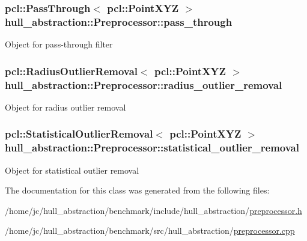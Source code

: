 \subsubsection[{\texorpdfstring{pass\+\_\+through}{pass_through}}]{\setlength{\rightskip}{0pt plus 5cm}pcl\+::\+Pass\+Through$<$ pcl\+::\+Point\+X\+YZ $>$ hull\+\_\+abstraction\+::\+Preprocessor\+::pass\+\_\+through\hspace{0.3cm}{\ttfamily [private]}}\hypertarget{classhull__abstraction_1_1_preprocessor_a9396fe58d584ed1e7468f694f2458734}{}\label{classhull__abstraction_1_1_preprocessor_a9396fe58d584ed1e7468f694f2458734}
Object for pass-\/through filter 
\subsubsection[{\texorpdfstring{radius\+\_\+outlier\+\_\+removal}{radius_outlier_removal}}]{\setlength{\rightskip}{0pt plus 5cm}pcl\+::\+Radius\+Outlier\+Removal$<$ pcl\+::\+Point\+X\+YZ $>$ hull\+\_\+abstraction\+::\+Preprocessor\+::radius\+\_\+outlier\+\_\+removal\hspace{0.3cm}{\ttfamily [private]}}\hypertarget{classhull__abstraction_1_1_preprocessor_af0a5e8dd7c130abe702230dd59529360}{}\label{classhull__abstraction_1_1_preprocessor_af0a5e8dd7c130abe702230dd59529360}
Object for radius outlier removal 
\subsubsection[{\texorpdfstring{statistical\+\_\+outlier\+\_\+removal}{statistical_outlier_removal}}]{\setlength{\rightskip}{0pt plus 5cm}pcl\+::\+Statistical\+Outlier\+Removal$<$ pcl\+::\+Point\+X\+YZ $>$ hull\+\_\+abstraction\+::\+Preprocessor\+::statistical\+\_\+outlier\+\_\+removal\hspace{0.3cm}{\ttfamily [private]}}\hypertarget{classhull__abstraction_1_1_preprocessor_af9b4760942460988811e9989da18633f}{}\label{classhull__abstraction_1_1_preprocessor_af9b4760942460988811e9989da18633f}
Object for statistical outlier removal 

The documentation for this class was generated from the following files\+:\begin{DoxyCompactItemize}
\item 
/home/jc/hull\+\_\+abstraction/benchmark/include/hull\+\_\+abstraction/\hyperlink{benchmark_2include_2hull__abstraction_2preprocessor_8h}{preprocessor.\+h}\item 
/home/jc/hull\+\_\+abstraction/benchmark/src/hull\+\_\+abstraction/\hyperlink{benchmark_2src_2hull__abstraction_2preprocessor_8cpp}{preprocessor.\+cpp}\end{DoxyCompactItemize}
